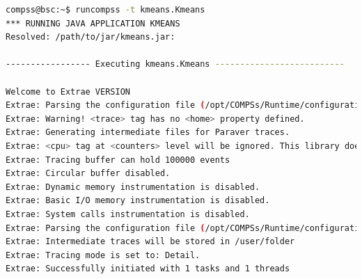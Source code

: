 \begin{lstlisting}[language=bash]
compss@bsc:~$ runcompss -t kmeans.Kmeans
*** RUNNING JAVA APPLICATION KMEANS
Resolved: /path/to/jar/kmeans.jar:

----------------- Executing kmeans.Kmeans --------------------------

Welcome to Extrae VERSION
Extrae: Parsing the configuration file (/opt/COMPSs/Runtime/configuration/xml/tracing/extrae_basic.xml) begins
Extrae: Warning! <trace> tag has no <home> property defined.
Extrae: Generating intermediate files for Paraver traces.
Extrae: <cpu> tag at <counters> level will be ignored. This library does not support CPU HW.
Extrae: Tracing buffer can hold 100000 events
Extrae: Circular buffer disabled.
Extrae: Dynamic memory instrumentation is disabled.
Extrae: Basic I/O memory instrumentation is disabled.
Extrae: System calls instrumentation is disabled.
Extrae: Parsing the configuration file (/opt/COMPSs/Runtime/configuration/xml/tracing/extrae_basic.xml) has ended
Extrae: Intermediate traces will be stored in /user/folder
Extrae: Tracing mode is set to: Detail.
Extrae: Successfully initiated with 1 tasks and 1 threads


\end{lstlisting}
